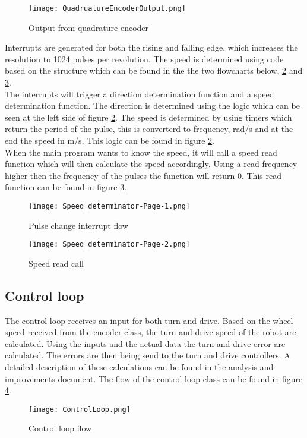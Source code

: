 \begin{figure}[H]
\centering
\texttt{[image: QuadruatureEncoderOutput.png]}
\caption{Output from quadrature encoder}
\label{fig::QuadEnc}
\end{figure}

Interrupts are generated for both the rising and falling edge, which increases the resolution to 1024 pulses per revolution.
The speed is determined using code based on the structure which can be found in the the two flowcharts below, \ref{fig::PCF} and \ref{fig::SRC}.
\\
The interrupts will trigger a direction determination function and a speed determination function.
The direction is determined using the logic which can be seen at the left side of figure \ref{fig::PCF}.
The speed is determined by using timers which return the period of the pulse, this is converterd to frequency, rad/s and at the end the speed in m/s.
This logic can be found in figure \ref{fig::PCF}.
\\
When the main program wants to know the speed, it will call a speed read function which will then calculate the speed accordingly. Using a read frequency higher then the frequency of the pulses the function will return 0.
This read function can be found in figure \ref{fig::SRC}.

\begin{figure}[H]
\centering
\texttt{[image: Speed\_determinator-Page-1.png]}
\caption{Pulse change interrupt flow}
\label{fig::PCF}
\end{figure}


\begin{figure}[H]
\centering
\texttt{[image: Speed\_determinator-Page-2.png]}
\caption{Speed read call}
\label{fig::SRC}
\end{figure}

\subsection{Control loop}
The control loop receives an input for both turn and drive. 
Based on the wheel speed received from the encoder class, the turn and drive speed of the robot are calculated. 
Using the inputs and the actual data the turn and drive error are calculated.
The errors are then being send to the turn and drive controllers.
A detailed description of these calculations can be found in the analysis and improvements document. 
The flow of the control loop class can be found in figure \ref{fig::CLF}.

\begin{figure}[H]
\centering
\texttt{[image: ControlLoop.png]}
\caption{Control loop flow}
\label{fig::CLF}
\end{figure}

\newpage